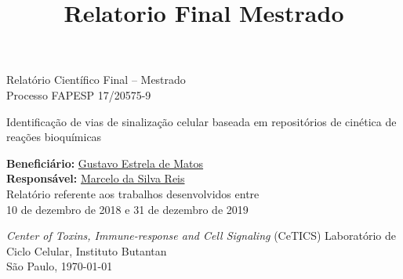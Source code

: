 \documentclass[12pt]{article}
\title{Relatorio Final Mestrado}
\begin{document}
%
\doublespacing

\begin{titlepage}
    \vfill 
    \begin{center}
        {\Large Relatório Científico Final -- Mestrado\\
         \bigskip
         Processo FAPESP 17/20575-9
        }
        
        \bigskip
        \bigskip
    
        {\LARGE Identificação de vias de sinalização celular baseada em
        repositórios de cinética de reações bioquímicas}

        \bigskip
        \bigskip
        {\Large {\bf Beneficiário:}
        \href{mailto:gustavo.estrela.matos@usp.br}{Gustavo Estrela de
        Matos}\\ 
        
        {\bf Responsável:}
        \href{mailto:marcelo.reis@butantan.gov.br}{Marcelo da Silva
        Reis}\\

        \bigskip
        \bigskip
        \bigskip
        \bigskip
        \bigskip
        \bigskip
        \bigskip
    \large    Relatório referente aos trabalhos desenvolvidos entre\\ 10 de
        dezembro de 2018 e 31 de dezembro de 2019

        \bigskip
        \bigskip
        \bigskip
        \bigskip
        \bigskip
        \bigskip
        \bigskip
\large {\em Center of Toxins, Immune-response and Cell Signaling} (CeTICS)
        Laboratório de Ciclo Celular, Instituto
        Butantan\\
        \bigskip
        São Paulo, \today\\
        }

        \bigskip
        \bigskip

       

\end{center}
\end{titlepage}


\tableofcontents

\pagebreak
\end{document}
